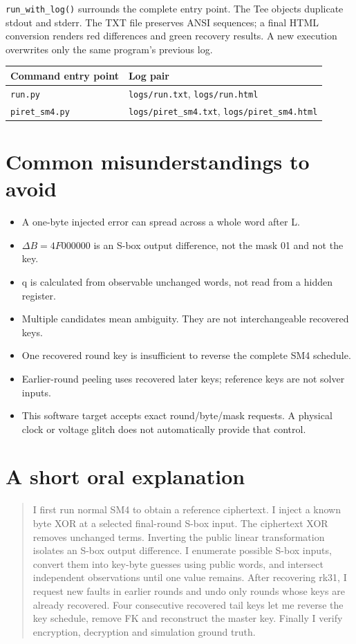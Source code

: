 \documentclass[11pt,a4paper]{report}
\begin{document}
\texttt{run\_with\_log()} surrounds the complete entry point. The Tee objects duplicate stdout and stderr. The TXT file preserves ANSI sequences; a final HTML conversion renders red differences and green recovery results. A new execution overwrites only the same program's previous log.
\begin{center}\begin{tabular}{ll}\toprule Command entry point&Log pair\\\midrule
\texttt{run.py}&\texttt{logs/run.txt}, \texttt{logs/run.html}\\
\texttt{piret\_sm4.py}&\texttt{logs/piret\_sm4.txt}, \texttt{logs/piret\_sm4.html}\\\bottomrule\end{tabular}\end{center}

\section{Common misunderstandings to avoid}
\begin{itemize}
\item A one-byte injected error can spread across a whole word after L.
\item \(\Delta B=4F000000\) is an S-box output difference, not the mask 01 and not the key.
\item q is calculated from observable unchanged words, not read from a hidden register.
\item Multiple candidates mean ambiguity. They are not interchangeable recovered keys.
\item One recovered round key is insufficient to reverse the complete SM4 schedule.
\item Earlier-round peeling uses recovered later keys; reference keys are not solver inputs.
\item This software target accepts exact round/byte/mask requests. A physical clock or voltage glitch does not automatically provide that control.
\end{itemize}

\section{A short oral explanation}
\begin{quote}
I first run normal SM4 to obtain a reference ciphertext. I inject a known byte XOR at a selected final-round S-box input. The ciphertext XOR removes unchanged terms. Inverting the public linear transformation isolates an S-box output difference. I enumerate possible S-box inputs, convert them into key-byte guesses using public words, and intersect independent observations until one value remains. After recovering rk31, I request new faults in earlier rounds and undo only rounds whose keys are already recovered. Four consecutive recovered tail keys let me reverse the key schedule, remove FK and reconstruct the master key. Finally I verify encryption, decryption and simulation ground truth.
\end{quote}
\end{document}

